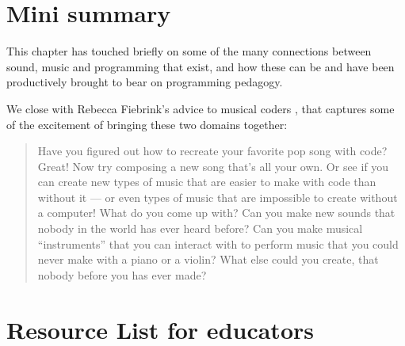 \section{Mini summary}
This chapter has touched briefly on some of the many connections between sound, music and programming that exist, and how these can be and have been productively brought to bear on programming pedagogy. 


We close with Rebecca Fiebrink's advice to musical coders \cite[p 145]{brown20}, that captures some of the excitement of bringing these two domains together:
\begin{quote}
    Have you figured out how to recreate your favorite pop song with code? Great! Now try composing a new song that's all your own. Or see if you can create new types of music that are easier to make with code than without it --- or even types of music that are impossible to create without a computer! What do you come up with? Can you make new sounds that nobody in the world has ever heard before? Can you make musical “instruments” that you can interact with to perform music that you could never make with a piano or a violin? What else could you create, that nobody before you has ever made?
\end{quote}

\section{Resource List for educators}



  

